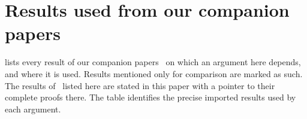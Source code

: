 \section{Results used from our companion papers}\label{app:companion}

 lists every result of our companion papers~\cite{DM-game,DM-lamps,DM-H3,DM-ID,Dou26,DM-U3} on which an argument
here depends, and where it is used. Results mentioned only for comparison are marked as such. The results of~\cite{DM-game} listed
here are stated in this paper with a pointer to their complete proofs there. The table identifies the precise imported results used by each argument.


